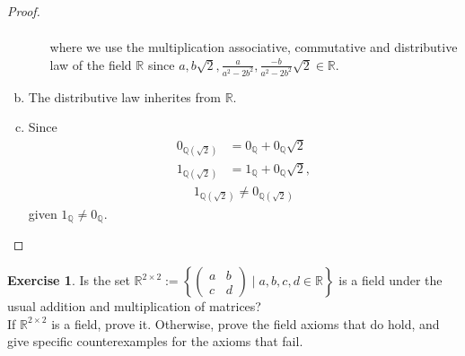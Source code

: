 \documentclass{amsart}
\newcommand{\bbr}{\mathbb{R}}
\newcommand{\bbq}{\mathbb{Q}}
\theoremstyle{plain}
\theoremstyle{definition}
\newtheorem{exer}[lem]{Exercise}
\begin{document}
\begin{proof}
\begin{enumerate}[(a)]
\begin{enumerate}[(1)]
\begin{align*}
					\end{align*}
		      		where we use the multiplication associative, commutative and distributive law of the field $\bbr$ since $a,b\sqrt 2, \frac{a}{a^2-2b^2}, \frac{-b}{a^2-2b^2}\sqrt 2 \in \bbr$.\\ 
			\end{enumerate}
		\item 
		  The distributive law inherites from $\bbr$.
		   \item
			Since
			  \begin{align*}
			 	  0_{\bbq(\sqrt 2)} &= 0_{\bbq} + 0_{\bbq}\sqrt 2\\
			 	  1_{\bbq(\sqrt 2)} &= 1_{\bbq} + 0_{\bbq}\sqrt 2,
		  	 \end{align*}
		  	 \begin{align*}
		  	 	 1_{\bbq(\sqrt 2)} \neq 0_{\bbq(\sqrt 2)} 
		  	 \end{align*}
		  	 given $1_{\bbq} \neq 0_{\bbq}$.
		\end{enumerate}



\end{proof}


\begin{exer}
Is
the set $\bbr^{2\times 2}:=\left\{\left(\begin{smallmatrix}a&b\\c&d\end{smallmatrix}\right)\mid a,b,c,d\in\bbr\right\}$ is a field under the usual addition and multiplication of matrices? \\

If $\bbr^{2\times 2}$ is a field, prove it.
Otherwise, prove the field axioms that do hold, and give specific counterexamples for the axioms that fail.
\end{exer}
\end{document}
